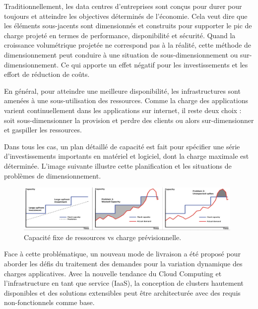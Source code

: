 Traditionnellement, les data centres d'entreprises sont conçus pour durer pour toujours et atteindre les objectives déterminés de l'économie. Cela veut dire que les éléments sous-jacents sont dimensionnés et construits pour supporter le pic de charge projeté en termes de performance, disponibilité et sécurité. Quand la croissance volumétrique projetée ne correspond pas à la réalité, cette méthode de dimensionnement peut conduire à une situation de sous-dimensionnement ou sur-dimensionnement. Ce qui apporte un effet négatif pour les investissements et les effort de réduction de coûts.

En général, pour atteindre une meilleure disponibilité, les infrastructures sont amenées à une sous-utilisation des ressources. Comme la charge des applications varient continuellement dans les applications sur internet, il reste deux choix : soit sous-dimensionner la provision et perdre des clients ou alors sur-dimensionner et gaspiller les ressources. 

Dans tous les cas, un plan détaillé de capacité est fait pour spécifier une série d'investissements importants en matériel et logiciel, dont la charge maximale est déterminée. L'image suivante illustre cette planification et les situations de problèmes de dimensionnement.


\begin{figure}[h]
\begin{center}
\includegraphics[width=0.98\textwidth]{images/fixed_capacity_load_prediction} 
\caption{Capacité fixe de ressources vs charge prévisionnelle. \cite{awsScaling}}
\end{center}
\end{figure}

Face à cette problématique, un nouveau mode de livraison a été proposé pour aborder les défis du traitement des demandes pour la variation dynamique des charges applicatives. Avec la nouvelle tendance du Cloud Computing et l'infrastructure en tant que service (IaaS), la conception de clusters hautement disponibles et des solutions extensibles peut être architecturée avec des requis non-fonctionnels comme base. 

